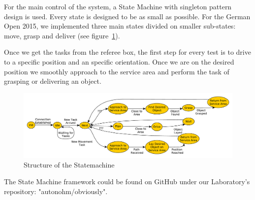For the main control of the system, a State Machine with singleton pattern design is used. Every state is designed to be as small as possible. For the German Open 2015, we implemented three main states divided on smaller sub-states: move, grasp and deliver (see figure~\ref{fig:SM}).

Once we get the tasks from the referee box, the first step for every test is to drive to a specific position and an specific orientation. Once we are on the desired position we smoothly approach to the service area and perform the task of grasping or delivering an object. 	

\begin{figure}[htbp]
	\centering
	\includegraphics[width=\textwidth]{img/sm}
	\caption{Structure of the Statemachine}
	\label{fig:SM}
\end{figure}


The State Machine framework could be found on GitHub under our Laboratory's repository: "autonohm/obviously". 